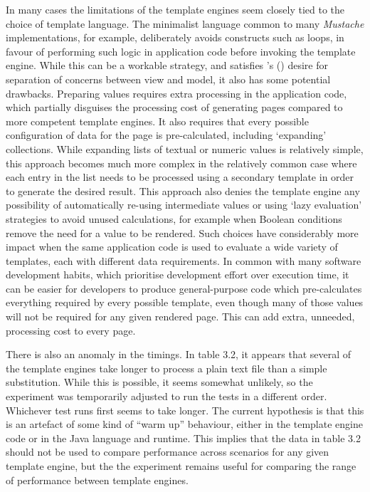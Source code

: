 In many cases the limitations of the template engines seem closely tied to the choice of template language. The minimalist language common to many \emph{Mustache} implementations, for example, deliberately avoids constructs such as loops, in favour of performing such logic in application code before invoking the template engine. While this can be a workable strategy, and satisfies \citeauthor{Parr2004}'s (\citeyear{Parr2004}) desire for separation of concerns between view and model, it also has some potential drawbacks. Preparing values requires extra processing in the application code, which partially disguises the processing cost of generating pages compared to more competent template engines. It also requires that every possible configuration of data for the page is pre-calculated, including `expanding' collections. While expanding lists of textual or numeric values is relatively simple, this approach becomes much more complex in the relatively common case where each entry in the list needs to be processed using a secondary template in order to generate the desired result. This approach also denies the template engine any possibility of automatically re-using intermediate values or using `lazy evaluation' strategies to avoid unused calculations, for example when Boolean conditions remove the need for a value to be rendered. Such choices have considerably more impact when the same application code is used to evaluate a wide variety of templates, each with different data requirements. In common with many software development habits, which prioritise development effort over execution time, it can be easier for developers to produce general-purpose code which pre-calculates everything required by every possible template, even though many of those values will not be required for any given rendered page. This can add extra, unneeded, processing cost to every page.

There is also an anomaly in the timings. In table 3.2, it appears that several of the template engines take longer to process a plain text file than a simple substitution. While this is possible, it seems somewhat unlikely, so the experiment was temporarily adjusted to run the tests in a different order. Whichever test runs first seems to take longer. The current hypothesis is that this is an artefact of some kind of “warm up” behaviour, either in the template engine code or in the Java language and runtime. This implies that the data in table 3.2 should not be used to compare performance across scenarios for any given template engine, but the the experiment remains useful for comparing the range of performance between template engines.

